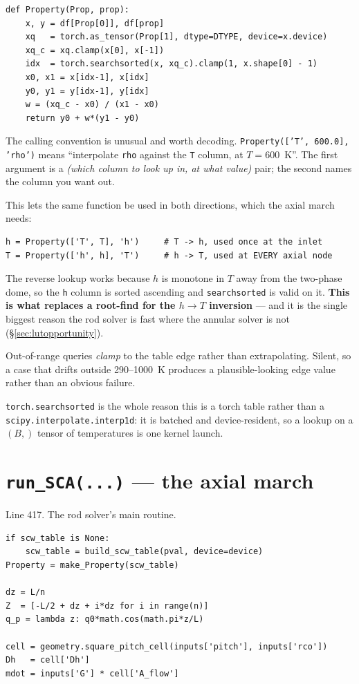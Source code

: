 \documentclass[11pt]{article}
\newcommand{\code}[1]{\texttt{#1}}
\begin{document}
\begin{lstlisting}
def Property(Prop, prop):
    x, y = df[Prop[0]], df[prop]
    xq   = torch.as_tensor(Prop[1], dtype=DTYPE, device=x.device)
    xq_c = xq.clamp(x[0], x[-1])
    idx  = torch.searchsorted(x, xq_c).clamp(1, x.shape[0] - 1)
    x0, x1 = x[idx-1], x[idx]
    y0, y1 = y[idx-1], y[idx]
    w = (xq_c - x0) / (x1 - x0)
    return y0 + w*(y1 - y0)
\end{lstlisting}

The calling convention is unusual and worth decoding. \code{Property(['T', 600.0],
'rho')} means ``interpolate \code{rho} against the \code{T} column, at $T = 600$~K''. The
first argument is a \emph{(which column to look up in, at what value)} pair; the second
names the column you want out.

This lets the same function be used in both directions, which the axial march needs:
\begin{lstlisting}
h = Property(['T', T], 'h')     # T -> h, used once at the inlet
T = Property(['h', h], 'T')     # h -> T, used at EVERY axial node
\end{lstlisting}
The reverse lookup works because $h$ is monotone in $T$ away from the two-phase dome,
so the \code{h} column is sorted ascending and \code{searchsorted} is valid on it.
\textbf{This is what replaces a root-find for the $h \to T$ inversion} --- and it is the
single biggest reason the rod solver is fast where the annular solver is not
(\S\ref{sec:lutopportunity}).

Out-of-range queries \emph{clamp} to the table edge rather than extrapolating. Silent, so
a case that drifts outside 290--1000~K produces a plausible-looking edge value rather
than an obvious failure.

\code{torch.searchsorted} is the whole reason this is a torch table rather than a
\code{scipy.interpolate.interp1d}: it is batched and device-resident, so a lookup on a
$(B,)$ tensor of temperatures is one kernel launch.

\section{\code{run\_SCA(...)} --- the axial march}
Line 417. The rod solver's main routine.

\begin{lstlisting}
if scw_table is None:
    scw_table = build_scw_table(pval, device=device)
Property = make_Property(scw_table)

dz = L/n
Z  = [-L/2 + dz + i*dz for i in range(n)]
q_p = lambda z: q0*math.cos(math.pi*z/L)

cell = geometry.square_pitch_cell(inputs['pitch'], inputs['rco'])
Dh   = cell['Dh']
mdot = inputs['G'] * cell['A_flow']
\end{lstlisting}
\end{document}
